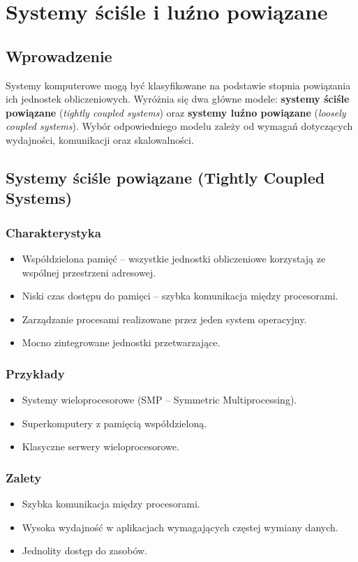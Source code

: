 \section{Systemy ściśle i luźno powiązane}

\subsection{Wprowadzenie}
Systemy komputerowe mogą być klasyfikowane na podstawie stopnia powiązania ich jednostek obliczeniowych. Wyróżnia się dwa główne modele: \textbf{systemy ściśle powiązane} (\textit{tightly coupled systems}) oraz \textbf{systemy luźno powiązane} (\textit{loosely coupled systems}). Wybór odpowiedniego modelu zależy od wymagań dotyczących wydajności, komunikacji oraz skalowalności.

\subsection{Systemy ściśle powiązane (Tightly Coupled Systems)}

\subsubsection{Charakterystyka}
\begin{itemize}
    \item Współdzielona pamięć – wszystkie jednostki obliczeniowe korzystają ze wspólnej przestrzeni adresowej.
    \item Niski czas dostępu do pamięci – szybka komunikacja między procesorami.
    \item Zarządzanie procesami realizowane przez jeden system operacyjny.
    \item Mocno zintegrowane jednostki przetwarzające.
\end{itemize}

\subsubsection{Przykłady}
\begin{itemize}
    \item Systemy wieloprocesorowe (SMP – Symmetric Multiprocessing).
    \item Superkomputery z pamięcią współdzieloną.
    \item Klasyczne serwery wieloprocesorowe.
\end{itemize}

\subsubsection{Zalety}
\begin{itemize}
    \item Szybka komunikacja między procesorami.
    \item Wysoka wydajność w aplikacjach wymagających częstej wymiany danych.
    \item Jednolity dostęp do zasobów.
\end{itemize}

